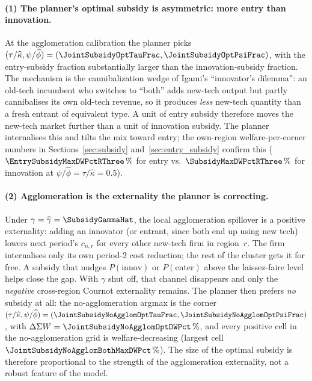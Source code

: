 \documentclass[12pt]{article}
\begin{document}
\paragraph{(1) The planner's optimal subsidy is asymmetric: more entry
than innovation.} At the agglomeration calibration the planner picks
$(\tau/\widehat{\kappa}, \psi/\widehat{\phi}) =
(\JointSubsidyOptTauFrac, \JointSubsidyOptPsiFrac)$, with the
entry-subsidy fraction substantially larger than the innovation-subsidy
fraction. The mechanism is the cannibalization wedge of Igami's
``innovator's dilemma'': an old-tech incumbent who switches to
``both'' adds new-tech output but partly cannibalises its own old-tech
revenue, so it produces \emph{less} new-tech quantity than a fresh
entrant of equivalent type. A unit of entry subsidy therefore moves
the new-tech market further than a unit of innovation subsidy. The
planner internalises this and tilts the mix toward entry; the
own-region welfare-per-corner numbers in
Sections~\ref{sec:subsidy} and~\ref{sec:entry_subsidy} confirm this
($\EntrySubsidyMaxDWPctRThree\,\%$ for entry vs.\
$\SubsidyMaxDWPctRThree\,\%$ for innovation at $\psi/\widehat{\phi} =
\tau/\widehat{\kappa} = 0.5$).

\paragraph{(2) Agglomeration is the externality the planner is
correcting.} Under $\gamma = \widehat{\gamma} = \SubsidyGammaHat$, the
local agglomeration spillover is a positive externality: adding an
innovator (or entrant, since both end up using new tech) lowers next
period's $c_{n,r}$ for every other new-tech firm in region~$r$. The
firm internalises only its own period-2 cost reduction; the rest of
the cluster gets it for free. A subsidy that nudges $P(\mathrm{innov})$
or $P(\mathrm{enter})$ above the laissez-faire level helps close the
gap. With $\gamma$ shut off, that channel disappears and only the
\emph{negative} cross-region Cournot externality remains. The planner
then prefers \emph{no} subsidy at all: the no-agglomeration argmax is
the corner $(\tau/\widehat{\kappa}, \psi/\widehat{\phi}) =
(\JointSubsidyNoAgglomOptTauFrac, \JointSubsidyNoAgglomOptPsiFrac)$,
with $\Delta\Sigma W = \JointSubsidyNoAgglomOptDWPct\,\%$, and every
positive cell in the no-agglomeration grid is welfare-decreasing
(largest cell $\JointSubsidyNoAgglomBothMaxDWPct\,\%$). The size of
the optimal subsidy is therefore proportional to the strength of the
agglomeration externality, not a robust feature of the model.
\end{document}

